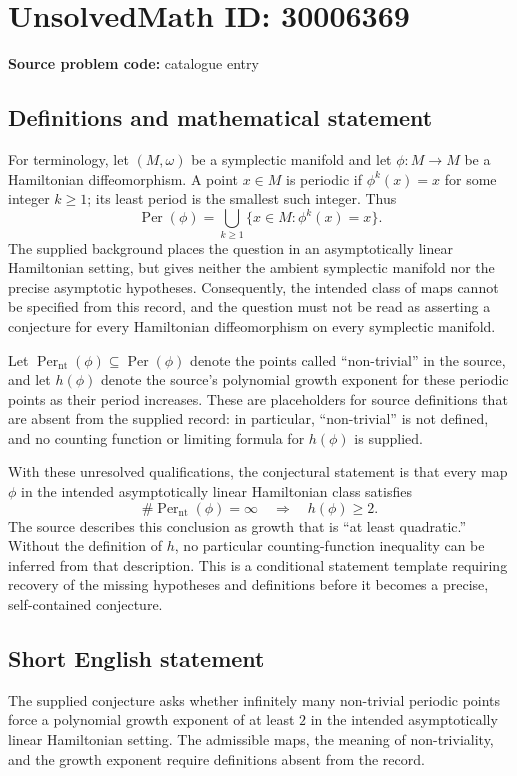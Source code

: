 \documentclass[11pt]{article}
\begin{document}
\section*{UnsolvedMath ID: 30006369}
\textbf{Source problem code:} catalogue entry
\subsection{Definitions and mathematical statement}
For terminology, let \((M,\omega)\) be a symplectic manifold and let \(\phi\colon M\to M\) be a Hamiltonian diffeomorphism. A point \(x\in M\) is periodic if \(\phi^k(x)=x\) for some integer \(k\geq 1\); its least period is the smallest such integer. Thus
\[
\operatorname{Per}(\phi)=\bigcup_{k\geq 1}\{x\in M:\phi^k(x)=x\}.
\]
The supplied background places the question in an asymptotically linear Hamiltonian setting, but gives neither the ambient symplectic manifold nor the precise asymptotic hypotheses. Consequently, the intended class of maps cannot be specified from this record, and the question must not be read as asserting a conjecture for every Hamiltonian diffeomorphism on every symplectic manifold.

Let \(\operatorname{Per}_{\mathrm{nt}}(\phi)\subseteq\operatorname{Per}(\phi)\) denote the points called ``non-trivial'' in the source, and let \(h(\phi)\) denote the source's polynomial growth exponent for these periodic points as their period increases. These are placeholders for source definitions that are absent from the supplied record: in particular, ``non-trivial'' is not defined, and no counting function or limiting formula for \(h(\phi)\) is supplied.

With these unresolved qualifications, the conjectural statement is that every map \(\phi\) in the intended asymptotically linear Hamiltonian class satisfies
\[
\#\operatorname{Per}_{\mathrm{nt}}(\phi)=\infty
\quad\Longrightarrow\quad
h(\phi)\geq 2.
\]
The source describes this conclusion as growth that is ``at least quadratic.'' Without the definition of \(h\), no particular counting-function inequality can be inferred from that description. This is a conditional statement template requiring recovery of the missing hypotheses and definitions before it becomes a precise, self-contained conjecture.
\subsection{Short English statement}
The supplied conjecture asks whether infinitely many non-trivial periodic points force a polynomial growth exponent of at least \(2\) in the intended asymptotically linear Hamiltonian setting. The admissible maps, the meaning of non-triviality, and the growth exponent require definitions absent from the record.
\end{document}
